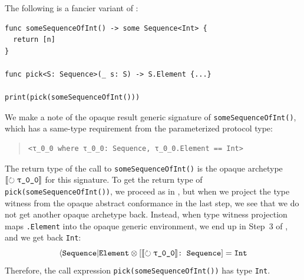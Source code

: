 \documentclass[../generics]{subfiles}
\begin{document}
\begin{example}
The following is a fancier variant of :
\begin{Verbatim}
func someSequenceOfInt() -> some Sequence<Int> {
  return [n]
}

func pick<S: Sequence>(_ s: S) -> S.Element {...}

print(pick(someSequenceOfInt()))
\end{Verbatim}
We make a note of the opaque result generic signature of \texttt{someSequenceOfInt()}, which has a same-type requirement from the parameterized protocol type:
\begin{quote}
\begin{verbatim}
<τ_0_0 where τ_0_0: Sequence, τ_0_0.Element == Int>
\end{verbatim}
\end{quote}
The return type of the call to \texttt{someSequenceOfInt()} is the opaque archetype $\Ox$ for this signature. To get the return type of \texttt{pick(someSequenceOfInt())}, we proceed as in , but when we project the type witness from the opaque abstract conformance in the last step, we see that we do not get another opaque archetype back. Instead, when type witness projection maps \texttt{\rT.Element} into the opaque generic environment, we end up in Step~3 of , and we get back \texttt{Int}:
\[
\AElement \otimes \ConfReq{$\Ox$}{Sequence} = \texttt{Int}
\]
Therefore, the call expression \texttt{pick(someSequenceOfInt())} has type \texttt{Int}.
\end{example}
\end{document}
